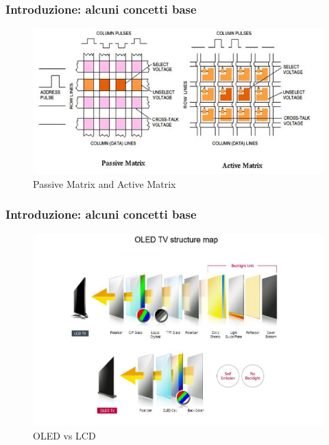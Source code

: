 \documentclass[12pt]{beamer}
\begin{document}
	\begin{frame}
		\frametitle{Introduzione: alcuni concetti base}
		\begin{figure}
			\centering
			\includegraphics[width=1\linewidth]{IMMAGINI/matrix_passive}
			\caption{ Passive Matrix and Active Matrix}
			\label{fig:matrixpassive}
		\end{figure}
	\end{frame}
	\begin{frame}
		\frametitle{Introduzione: alcuni concetti base}
		\begin{figure}
			\centering
			\includegraphics[width=1\linewidth]{IMMAGINI/OLED_vs_LCD}
			\caption{OLED vs LCD}
			\label{fig:oledvslcd}
		\end{figure}	
	\end{frame}
\end{document}
